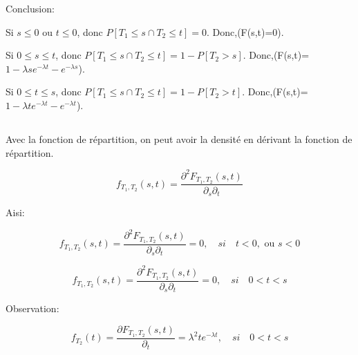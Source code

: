 \documentclass[a4paper]{article}
\begin{document}
Conclusion: 

Si $s \leq 0$ ou $t \leq 0$, donc $P[{T_1 \leq s} \cap {T_2 \leq t}]=0$. Donc,(F(s,t)=0).

Si $0 \leq s \leq t $, donc $P[{T_1 \leq s} \cap {T_2 \leq t}]=1-P[T_2 > s]$. Donc,(F(s,t)=$1 - \lambda se^{-\lambda t} - e^{-\lambda s}$).

Si $0 \leq t \leq s $, donc $P[{T_1 \leq s} \cap {T_2 \leq t}]=1-P[T_2 > t]$. Donc,(F(s,t)=$1 - \lambda te^{-\lambda t} - e^{-\lambda t}$).


\subsection{}



Avec la fonction de répartition, on  peut avoir la densité en dérivant la fonction
de répartition. 

 \begin{equation}
 f_{T_1,T_2}(s,t)   =   \frac{ \partial^2F_{T_1,T_2}(s,t)}{\partial_{s}\partial_{t}} 
 \end{equation}

Aisi:

 \begin{equation*}
 f_{T_1,T_2}(s,t)                                                               =
 \frac{  \partial^2F_{T_1,T_2}(s,t)}{\partial_{s}\partial_{t}}=0,  \quad si  \quad
 t<0,\text{ ou } s<0
 \end{equation*}


 \begin{equation*}
 f_{T_1,T_2}(s,t)                                                               =
 \frac{  \partial^2F_{T_1,T_2}(s,t)}{\partial_{s}\partial_{t}}=0,  \quad si  \quad
 0<t<s
 \end{equation*}

Observation:

 \begin{equation*}
 f_{T_2}(t)                                                               =
 \frac{ \partial F_{T_1,T_2}(s,t)}{\partial_{t}}=\lambda^2te^{-\lambda t}, \quad si \quad
 0<t<s
 \end{equation*}
\end{document}
